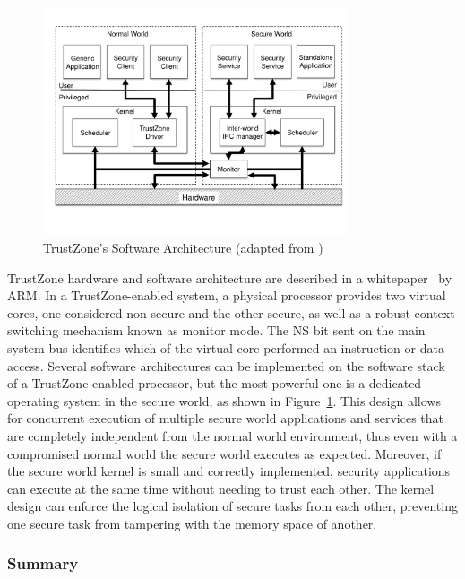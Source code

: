 \begin{figure}[t!]
	\centering
	\includegraphics[width=0.80\textwidth]{img/trustzone.pdf}
	\caption{TrustZone's Software Architecture (adapted from \cite{trustzone_whitepaper})}
	\label{fig:trustzone_architecture}
\end{figure}

TrustZone hardware and software architecture are described in a whitepaper~\cite{trustzone_whitepaper} by ARM. In a TrustZone-enabled system, a physical processor provides two virtual cores, one considered non-secure and the other secure, as well as a robust context switching mechanism known as monitor mode. The NS bit sent on the main system bus identifies which of the virtual core performed an instruction or data access. Several software architectures can be implemented on the software stack of a TrustZone-enabled processor, but the most powerful one is a dedicated operating system in the secure world, as shown in Figure~\ref{fig:trustzone_architecture}. This design allows for concurrent execution of multiple secure world applications and services that are completely independent from the normal world environment, thus even with a compromised normal world the secure world executes as expected. Moreover, if the secure world kernel is small and correctly implemented, security applications can execute at the same time without needing to trust each other. The kernel design can enforce the logical isolation of secure tasks from each other, preventing one secure task from tampering with the memory space of another.

\subsubsection{Summary}

